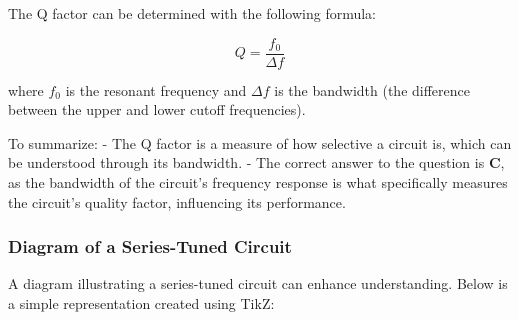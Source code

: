 The Q factor can be determined with the following formula:

\[
Q = \frac{f_0}{\Delta f}
\]

where \( f_0 \) is the resonant frequency and \( \Delta f \) is the bandwidth (the difference between the upper and lower cutoff frequencies).
 
To summarize:
- The Q factor is a measure of how selective a circuit is, which can be understood through its bandwidth.
- The correct answer to the question is \textbf{C}, as the bandwidth of the circuit's frequency response is what specifically measures the circuit's quality factor, influencing its performance.

\subsubsection{Diagram of a Series-Tuned Circuit}

A diagram illustrating a series-tuned circuit can enhance understanding. Below is a simple representation created using TikZ:

\begin{center}
\end{center}
